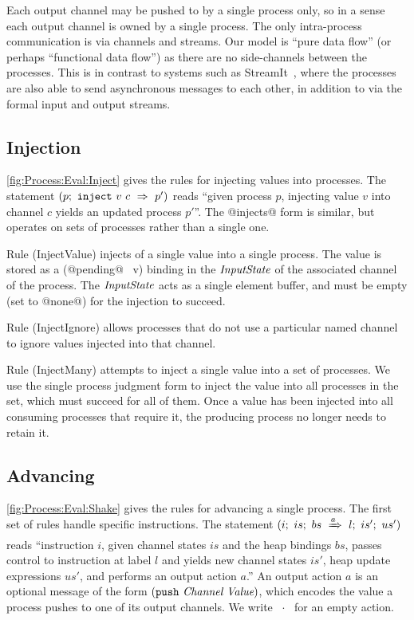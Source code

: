 Each output channel may be pushed to by a single process only, so in a sense each output channel is owned by a single process. The only intra-process communication is via channels and streams. Our model is ``pure data flow'' (or perhaps ``functional data flow'') as there are no side-channels between the processes. This is in contrast to systems such as StreamIt~\cite{thies2002streamit}, where the processes are also able to send asynchronous messages to each other, in addition to via the formal input and output streams.


\subsection{Injection}
\autoref{fig:Process:Eval:Inject} gives the rules for injecting values into processes. The statement $(p;~\texttt{inject}~v~c~\Rightarrow~p')$ reads ``given process $p$, injecting value $v$ into channel $c$ yields an updated process $p'$''. The @injects@ form is similar, but operates on sets of processes rather than a single one.

Rule (InjectValue) injects of a single value into a single process. The value is stored as a (@pending@~ v) binding in the $\textit{InputState}$ of the associated channel of the process. The $\textit{InputState}$ acts as a single element buffer, and must be empty (set to @none@) for the injection to succeed.

Rule (InjectIgnore) allows processes that do not use a particular named channel to ignore values injected into that channel.

Rule (InjectMany) attempts to inject a single value into a set of processes. We use the single process judgment form to inject the value into all processes in the set, which must succeed for all of them. Once a value has been injected into all consuming processes that require it, the producing process no longer needs to retain it.






\subsection{Advancing}
\autoref{fig:Process:Eval:Shake} gives the rules for advancing a single process. The first set of rules handle specific instructions. The statement $(i;~is;~bs~\xRightarrow{a}~l;~is';~us')$ reads ``instruction $i$, given channel states $is$ and the heap bindings $bs$, passes control to instruction at label $l$ and yields new channel states $is'$, heap update expressions $us'$, and performs an output action $a$.'' An output action $a$ is an optional message of the form $(\texttt{push}~\textit{Channel}~\textit{Value})$, which encodes the value a process pushes to one of its output channels. We write ~$\cdot$~ for an empty action. 

